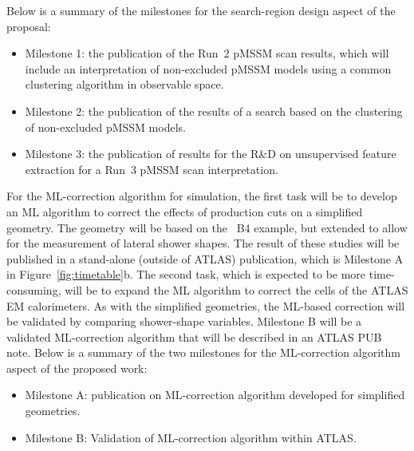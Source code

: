 \documentclass[letter, USenglish, 11pt, subfigure]{article}
\begin{document}
Below is a summary of the milestones for the search-region design aspect of the proposal:
\begin{itemize}
\item Milestone 1: the publication of the Run~2 pMSSM scan results, which will include an interpretation of non-excluded pMSSM models using a common clustering algorithm in observable space.
\item Milestone 2: the publication of the results of a search based on the clustering of non-excluded pMSSM models.
\item Milestone 3: the publication of results for the R\&D on unsupervised feature extraction for a Run~3 pMSSM scan interpretation.
\end{itemize}

For the ML-correction algorithm for simulation, the first task will be to develop an ML algorithm to correct the effects of production cuts on a simplified geometry. The geometry will be based on the \GEANT\ B4 example, but extended to allow for the measurement of lateral shower shapes. The result of these studies will be published in a stand-alone (outside of ATLAS) publication, which is Milestone A in Figure~\ref{fig:timetable}b. The second task, which is expected to be more time-consuming, will be to expand the ML algorithm to correct the cells of the ATLAS EM calorimeters. As with the simplified geometries, the ML-based correction will be validated by comparing shower-shape variables. Milestone B will be a validated ML-correction algorithm that will be described in an ATLAS PUB note.
Below is a summary of the two milestones for the ML-correction algorithm aspect of the proposed work:
\begin{itemize}
\item Milestone A: publication on ML-correction algorithm developed for simplified geometries.
\item Milestone B: Validation of ML-correction algorithm within ATLAS.
\end{itemize}
\end{document}
